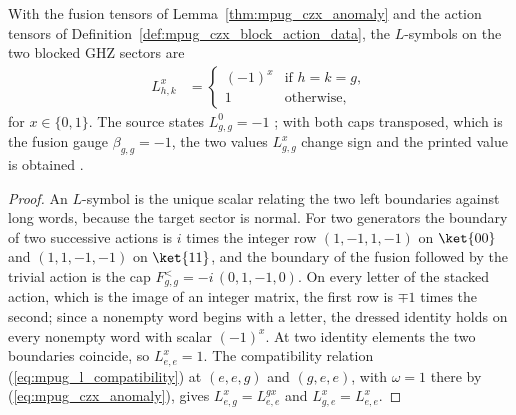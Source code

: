 \begin{lemma}
    \label{thm:mpug_czx_l_symbols}
    \leanok
    With the fusion tensors of Lemma~\ref{thm:mpug_czx_anomaly} and the action
    tensors of Definition~\ref{def:mpug_czx_block_action_data}, the
    $L$-symbols on the two blocked GHZ sectors are
    \begin{align}
        L^x_{h,k} & =
        \begin{cases}
            (-1)^x & \text{if } h=k=g, \\
            1      & \text{otherwise},
        \end{cases}
        \label{eq:mpug_czx_l_symbols}
    \end{align}
    for $x\in\{0,1\}$. The source states $L^0_{g,g}=-1$
    \cite[line~4699]{FrancoRubio2025MPUGauging}; with both caps transposed,
    which is the fusion gauge $\beta_{g,g}=-1$, the two values $L^x_{g,g}$
    change sign and the printed value is obtained
    \cite{gap:fbc25_czx_fusion_coordinate_compatibility}.
\end{lemma}

\begin{proof}\leanok
    An $L$-symbol is the unique scalar relating the two left boundaries against
    long words, because the target sector is normal. For two generators the
    boundary of two successive actions is $i$ times the integer row
    $(1,-1,1,-1)$ on $\ket{00}$ and $(1,1,-1,-1)$ on $\ket{11}$, and the
    boundary of the fusion followed by the trivial action is the cap
    $F^<_{g,g}=-i\,(0,1,-1,0)$. On every letter of the stacked action, which
    is the image of an integer matrix, the first row is $\mp1$ times the
    second; since a nonempty word begins with a letter, the dressed identity
    holds on every nonempty word with scalar $(-1)^x$. At two identity
    elements the two boundaries coincide, so $L^x_{e,e}=1$. The compatibility
    relation (\ref{eq:mpug_l_compatibility}) at $(e,e,g)$ and $(g,e,e)$, with
    $\omega=1$ there by (\ref{eq:mpug_czx_anomaly}), gives
    $L^x_{e,g}=L^{gx}_{e,e}$ and $L^x_{g,e}=L^x_{e,e}$.
\end{proof}

